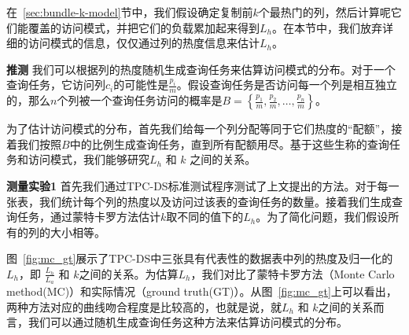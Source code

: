 \par 在~\ref{sec:bundle-k-model}节中，我们假设确定复制前$k$个最热门的列，然后计算呢它们能覆盖的访问模式，并把它们的负载累加起来得到$L_h$。在本节中，我们放弃详细的访问模式的信息，仅仅通过列的热度信息来估计$L_h$。

\par \noindent \textbf{推测} 我们可以根据列的热度随机生成查询任务来估算访问模式的分布。对于一个查询任务，它访问列$c_i$的可能性是$\frac{p_i}{m}$。假设查询任务是否访问每一个列是相互独立的，那么$n$个列被一个查询任务访问的概率是$B = \left\{\frac{p_{1}}{m}, \frac{p_{2}}{m}, \dots, \frac{p_{n}}{m}\right\}$。

\par 为了估计访问模式的分布，首先我们给每一个列分配等同于它们热度的“配额”，接着我们按照$B$中的比例生成查询任务，直到所有配额用尽。基于这些生称的查询任务和访问模式，我们能够研究$L_h$ 和 $k$ 之间的关系。

\par \noindent \textbf{测量实验1} 首先我们通过TPC-DS标准测试程序测试了上文提出的方法。对于每一张表，我们统计每个列的热度以及访问过该表的查询任务的数量。接着我们生成查询任务，通过蒙特卡罗方法估计$k$取不同的值下的$L_h$。为了简化问题，我们假设所有的列的大小相等。

\par 图~\ref{fig:mc_gt}展示了TPC-DS中三张具有代表性的数据表中列的热度及归一化的$L_h$，即 $\frac{L_h}{L_a}$ 和 $k$之间的关系。为估算$L_h$，我们对比了蒙特卡罗方法（Monte Carlo method(MC)）和实际情况（ground truth(GT)）。从图~\ref{fig:mc_gt}上可以看出，两种方法对应的曲线吻合程度是比较高的，也就是说，就$L_h$ 和 $k$之间的关系而言，我们可以通过随机生成查询任务这种方法来估算访问模式的分布。


